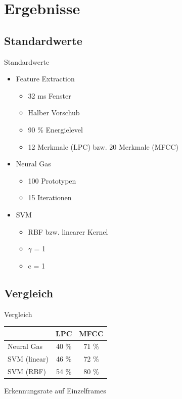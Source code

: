 \section{Ergebnisse}
\subsection{Standardwerte}
\begin{frame}{Standardwerte}
	\begin{itemize}[<+->]
		\item Feature Extraction
		\begin{itemize}[<1->]
			\item 32 ms Fenster
			\item Halber Vorschub
			\item 90 \% Energielevel
			\item 12 Merkmale (LPC) bzw. 20 Merkmale (MFCC)
		\end{itemize}
		\item Neural Gas
		\begin{itemize}[<1->]
			\item 100 Prototypen
			\item 15 Iterationen
		\end{itemize}
		\item SVM
		\begin{itemize}[<1->]
			\item RBF bzw. linearer Kernel
			\item $\gamma$ = 1
			\item c = 1
		\end{itemize}
	\end{itemize} 
\end{frame}

\subsection{Vergleich}
\begin{frame}{Vergleich}
	\begin{center}		
		\begin{tabular}{l|c|c}			
			& LPC & MFCC \\
			\hline
			Neural Gas & 40 \% & 71 \% \\
			SVM (linear) & 46 \% & 72 \% \\
			SVM (RBF) & 54 \% & 80 \% \\
		\end{tabular}
	\end{center}
	\begin{center}
		Erkennungsrate auf Einzelframes
	\end{center}	
\end{frame}

